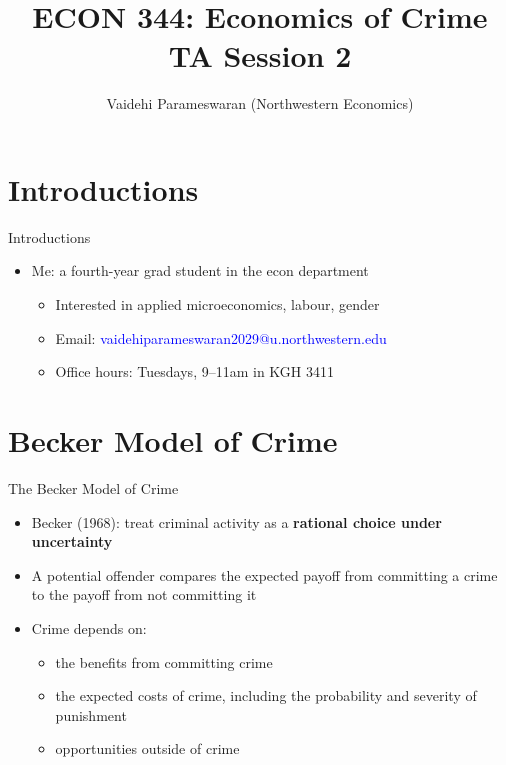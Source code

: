 \documentclass[11pt,notes=hide,aspectratio=169,mathserif]{beamer}
\title[class]{ECON 344: Economics of Crime \\ TA Session 2}
\author[vaidehi's class ]{Vaidehi Parameswaran (Northwestern Economics)}
\date{\monthname[\the\month] \the\year}
\begin{document}
\begin{frame}[plain]
\titlepage
\end{frame}

\section{Introductions}
\begin{frame}{Introductions}
\begin{itemize}
  \item Me: a fourth-year grad student in the econ department
  \begin{itemize}
    \item Interested in applied microeconomics, labour, gender
    \item Email: \textcolor{blue}{vaidehiparameswaran2029@u.northwestern.edu}
    \item Office hours: Tuesdays, 9--11am in KGH 3411
  \end{itemize}
\end{itemize}
\end{frame}


\section{Becker Model of Crime}

\begin{frame}{The Becker Model of Crime}
\begin{itemize}
\item Becker (1968): treat criminal activity as a \textbf{rational choice under uncertainty}
\pause \item A potential offender compares the expected payoff from committing a crime to the payoff from not committing it
\pause \item Crime depends on:
\begin{itemize}
    \item the benefits from committing crime
    \item the expected costs of crime, including the probability and severity of punishment
    \item opportunities outside of crime
\end{itemize}
\end{itemize}
\end{frame}
\end{document}
